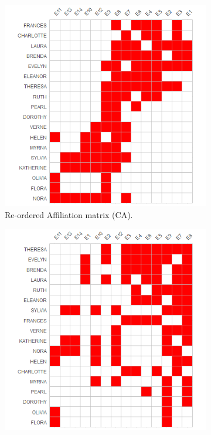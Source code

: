 \documentclass[a4paper,fleqn]{cas-sc}
\begin{document}
\begin{figure}[ht!]
    \captionsetup[subfigure]{font=footnotesize,labelfont=footnotesize}
    \centering
     \begin{subfigure}[b]{0.45\textwidth}
        \includegraphics[width=1.0\textwidth]{Plots/ca-reord.png}
            \caption{Re-ordered Affiliation matrix (CA).}
            \label{fig:ca-reord}
    \end{subfigure}
     \begin{subfigure}[b]{0.45\textwidth}
        \includegraphics[width=1.0\textwidth]{Plots/bon-reord.png}

\end{subfigure}
\end{figure}
\end{document}
